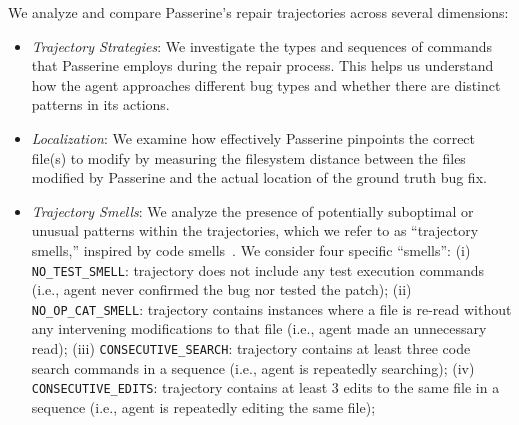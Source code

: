  We analyze and compare Passerine's repair trajectories across several dimensions:
\begin{itemize}

    \item \textit{Trajectory Strategies}: We investigate the types and sequences of commands
    that Passerine employs during the repair process. This helps us understand how the agent approaches different bug types and whether there are distinct patterns in its actions.
    
    \item \textit{Localization}: We examine how effectively Passerine pinpoints the correct file(s) to modify by measuring the filesystem distance between the files modified by Passerine and the actual location of the ground truth bug fix.
    
    \item \textit{Trajectory Smells}: We analyze the presence of potentially suboptimal or unusual patterns within the trajectories, which we refer to as ``trajectory smells,'' inspired by code smells~\cite{fowler2018refactoring}. We consider four specific ``smells'': 
    (i) \texttt{NO\_TEST\_SMELL}: trajectory does not include any test execution commands (i.e., agent never confirmed the bug nor tested the patch);
    (ii) \texttt{NO\_OP\_CAT\_SMELL}: trajectory contains instances where a file is re-read without any intervening modifications to that file (i.e., agent made an unnecessary read);
    (iii) \texttt{CONSECUTIVE\_SEARCH}: trajectory contains
    at least three code search commands in a sequence (i.e., agent is repeatedly searching);
    (iv) \texttt{CONSECUTIVE\_EDITS}: trajectory contains
    at least 3 edits to the same file in a sequence (i.e., agent is repeatedly editing the same file);
\end{itemize}










